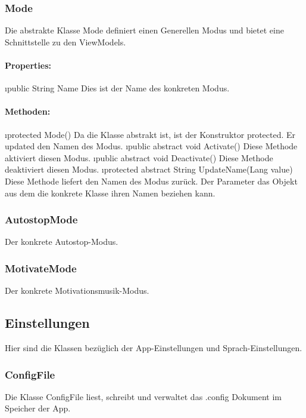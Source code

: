 \documentclass[../entwurf.tex]{subfiles}
\begin{document}
			\subsubsection{Mode}
				Die abstrakte Klasse Mode definiert einen Generellen Modus und bietet eine Schnittstelle zu den ViewModels.
				\paragraph{Properties:}
					\begin{itemize}
						\i{public String Name} Dies ist der Name des konkreten Modus.
					\end{itemize}
				\paragraph{Methoden:}
					\begin{itemize}
						\i{protected Mode()} Da die Klasse abstrakt ist, ist der Konstruktor protected. Er updated den Namen des Modus.
						\i{public abstract void Activate()} Diese Methode aktiviert diesen Modus.
						\i{public abstract void Deactivate()} Diese Methode deaktiviert diesen Modus.
						\i{protected abstract String UpdateName(Lang value)}  Diese Methode liefert den Namen des Modus zurück. Der Parameter das
						Objekt aus dem die konkrete Klasse ihren Namen beziehen kann.
					\end{itemize}
			\subsubsection{AutostopMode}
				Der konkrete Autostop-Modus.
			\subsubsection{MotivateMode}
				Der konkrete Motivationsmusik-Modus.
		\subsection{Einstellungen}
			Hier sind die Klassen bezüglich der App-Einstellungen und Sprach-Einstellungen.
			\subsubsection{ConfigFile}
				Die Klasse ConfigFile liest, schreibt und verwaltet das .config Dokument im Speicher der App.
\end{document}
